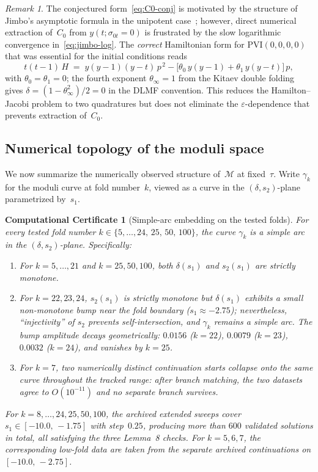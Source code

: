 \documentclass[11pt,a4paper]{article}
\theoremstyle{plain}
\newtheorem{computationalcertificate}[theorem]{Computational Certificate}
\theoremstyle{definition}
\theoremstyle{remark}
\newtheorem{remark}[theorem]{Remark}
\begin{document}
\begin{remark}
The conjectured form~\eqref{eq:C0-conj} is motivated by the
structure of Jimbo's asymptotic formula in the unipotent
case~\cite{Jim82}; however, direct numerical extraction of~$C_0$
from $y(t;\sigma_{0t}=0)$ is frustrated by the slow logarithmic
convergence in~\eqref{eq:jimbo-log}.
The \emph{correct} Hamiltonian form for $\mathrm{PVI}(0,0,0,0)$
that was essential for the initial conditions reads
\[
  t(t-1)\,H \;=\; y(y-1)(y-t)\,p^{\,2}
  - \bigl[\theta_0\,y(y-1) + \theta_1\,y(y-t)\bigr]\,p,
\]
with $\theta_0 = \theta_1 = 0$; the fourth exponent
$\theta_\infty = 1$ from the Kitaev double
folding~\cite{DC26} gives
$\delta = (1 - \theta_\infty^2)/2 = 0$
in the DLMF convention.  This reduces the Hamilton--Jacobi
problem to two quadratures but does not eliminate the
$\varepsilon$-dependence that prevents extraction of~$C_0$.
\end{remark}


\subsection{Numerical topology of the moduli space}%
\label{sec:moduli-topology}

We now summarize the numerically observed structure of~$\mathcal{M}$ at
fixed~$\tau$.
Write $\gamma_k$ for the moduli curve at fold number~$k$, viewed as
a curve in the $(\delta,s_2)$-plane parametrized by~$s_1$.

\begin{computationalcertificate}[Simple-arc embedding on the tested
  folds]
\label{prop:simple-arc}
For every tested fold number $k \in \{5,\ldots,24,\, 25,\, 50,\, 100\}$,
the curve $\gamma_k$ is a simple arc in the
$(\delta,s_2)$-plane.  Specifically:
\begin{enumerate}[label=\upshape(\roman*)]
\item For $k = 5,\ldots,21$ and $k = 25,50,100$, both
  $\delta(s_1)$ and $s_2(s_1)$ are strictly monotone.
\item For $k = 22,23,24$, $s_2(s_1)$ is strictly monotone
  but $\delta(s_1)$ exhibits a small non-monotone bump
  near the fold boundary ($s_1 \approx -2.75$);
  nevertheless, ``injectivity'' of $s_2$ prevents
  self-intersection, and $\gamma_k$ remains a simple arc.
  The bump amplitude decays geometrically:
  $0.0156$ ($k=22$), $0.0079$ ($k=23$),
  $0.0032$ ($k=24$), and vanishes by $k = 25$.
\item For $k = 7$, two numerically distinct continuation starts collapse
  onto the same curve throughout the tracked range: after branch matching,
  the two datasets agree to $O(10^{-11})$ and no separate branch survives.
\end{enumerate}
For $k = 8,\ldots,24,25,50,100$, the archived extended sweeps cover
$s_1 \in [-10.0,\, -1.75]$ with step~$0.25$, producing more than
$600$ validated solutions in total, all satisfying the three Lemma~8
checks.
For $k = 5,6,7$, the corresponding low-fold data are taken from the
separate archived continuations on $[-10.0,\, -2.75]$.
\end{computationalcertificate}
\end{document}
